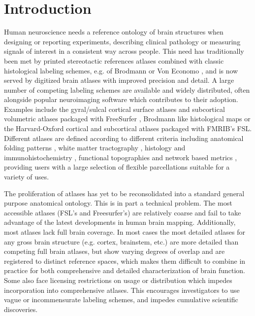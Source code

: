 \documentclass[10pt,letterpaper]{article}
\begin{document}
\section{Introduction}
Human neuroscience needs a reference ontology of brain structures when designing or reporting experiments, describing clinical pathology or measuring signals of interest in a consistent way across people. This need has traditionally been met by printed stereotactic references atlases combined with classic histological labeling schemes, e.g. of Brodmann or Von Economo \cite{mai2008atlas, talairach1988co}, and is now served by digitized brain atlases with improved precision and detail. A large number of competing labeling schemes are available and widely distributed, often alongside popular neuroimaging software which contributes to their adoption. Examples include the gyral/sulcal cortical surface atlases and subcortical volumetric atlases packaged with FreeSurfer , Brodmann like histological maps  or the Harvard-Oxford cortical and subcortical atlases packaged with FMRIB's FSL. Different atlases are defined according to different criteria including anatomical folding patterns , white matter tractography , histology and immunohistochemistry , functional topographies  and network based metrics , providing users with a large selection of flexible parcellations suitable for a variety of uses.

The proliferation of atlases has yet to be reconsolidated into a standard general purpose anatomical ontology. This is in part a technical problem. The most accessible atlases (FSL's and Freesurfer's) are relatively coarse and fail to take advantage of the latest developments in human brain mapping. Additionally, most atlases lack full brain coverage. In most cases the most detailed atlases for any gross brain structure (e.g. cortex, brainstem, etc.) are more detailed than competing full brain atlases, but show varying degrees of overlap and are registered to distinct reference spaces, which makes them difficult to combine in practice for both comprehensive and detailed characterization of brain function. Some also face licensing restrictions on usage or distribution which impedes incorporation into comprehensive atlases. This encourages investigators to use vague or incommensurate labeling schemes, and impedes cumulative scientific discoveries.
\end{document}

